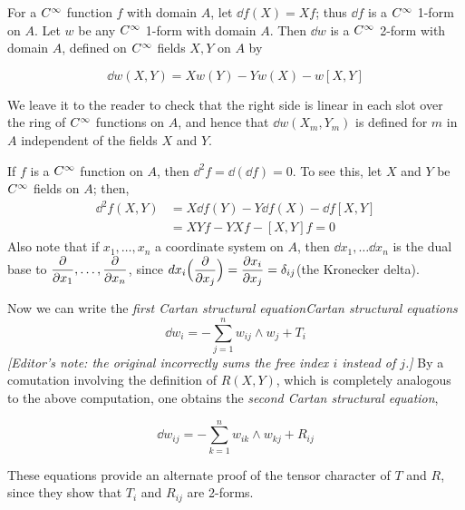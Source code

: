 \documentclass[../main]{subfiles}
\begin{document}
For a $C^\infty$ function $f$ with domain $A$, let $\dd f(X)=Xf$; thus $\dd f$ is a $C^\infty$ 1-form on $A$. Let $w$ be any $C^\infty$ 1-form with domain $A$. Then $\dd w$ is a $C^\infty$ 2-form with domain $A$, defined on $C^\infty$ fields $X,Y$ on $A$ by

\[\label{eqn:ch05.12}\tag{12} \dd w(X,Y) = Xw(Y)-Yw(X)-w[X,Y] \]

We leave it to the reader to check that the right side is linear in each slot over the ring of $C^\infty$ functions on $A$, and hence that $\dd w(X_m,Y_m)$ is defined for $m$ in $A$ independent of the fields $X$ and $Y$.

If $f$ is a $C^\infty$ function on $A$, then $\dd^2f = \dd(\dd f)=0$. To see this, let $X$ and $Y$ be $C^\infty$ fields on $A$; then,
\begin{align*}
    \dd^2f(X,Y) &= X\dd f(Y)-Y\dd f(X) - \dd f[X,Y]\\
    &= XYf-YXf -[X,Y]f=0
\end{align*}
Also note that if $x_1,\dots,x_n$ a coordinate system on $A$, then $\dd x_1,\dots \dd x_n$ is the dual base to $\dfrac{\partial }{\partial x_1},\dots ,\dfrac{\partial }{\partial x_n}$, since $dx_i\Big(\dfrac{\partial }{\partial x_j}\Big) = \dfrac{\partial x_i}{\partial x_j}=\delta_{ij}$(the Kronecker delta).

Now we can write the \emph{first Cartan structural equation}\emph{Cartan structural equations}
\[\label{eq:ch05.13}\tag{13} \dd w_i = -\sum_{j=1}^n w_{ij}\wedge w_j +T_i\]
\emph{[Editor's note: the original incorrectly sums the free index $i$ instead of $j$.]}
By a comutation involving the definition of $R(X,Y)$, which is completely analogous to the above computation, one obtains the \emph{second Cartan structural equation},

\[\label{eq:ch05.14}\tag{14} \dd w_{ij} = -\sum_{k=1}^n w_{ik}\wedge w_{kj} +R_{ij}\]

These equations provide an alternate proof of the tensor character of $T$ and $R$, since they show that $T_i$ and $R_{ij}$ are 2-forms.
\end{document}
